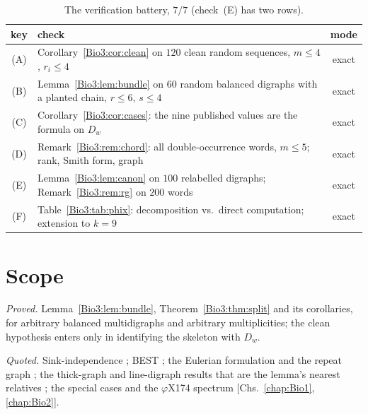 \begin{table}[ht]
\centering\small
\begin{tabular}{clc}
\toprule
key & check & mode\\
\midrule
(A) & Corollary~\ref{Bio3:cor:clean} on $120$ clean random sequences, $m\le4$, $r_i\le4$ & exact\\
(B) & Lemma~\ref{Bio3:lem:bundle} on $60$ random balanced digraphs with a planted chain, $r\le6$, $s\le4$ & exact\\
(C) & Corollary~\ref{Bio3:cor:cases}: the nine published values are the formula on $D_w$ & exact\\
(D) & Remark~\ref{Bio3:rem:chord}: all double-occurrence words, $m\le5$; rank, Smith form, graph & exact\\
(E) & Lemma~\ref{Bio3:lem:canon} on $100$ relabelled digraphs; Remark~\ref{Bio3:rem:rg} on $200$ words & exact\\
(F) & Table~\ref{Bio3:tab:phix}: decomposition vs.\ direct computation; extension to $k=9$ & exact\\
\bottomrule
\end{tabular}
\caption{The verification battery, $7/7$ (check~(E) has two rows).}
\label{Bio3:tab:battery}
\end{table}

\section{Scope}\label{Bio3:sec:scope}

\emph{Proved.} Lemma~\ref{Bio3:lem:bundle}, Theorem~\ref{Bio3:thm:split} and its corollaries, for
arbitrary balanced multidigraphs and arbitrary multiplicities; the clean hypothesis
enters only in identifying the skeleton with $D_w$.

\emph{Quoted.} Sink-independence \cite{HLMPPW}; BEST \cite{AEdB,SmithTutte}; the
Eulerian formulation and the repeat graph \cite{PTW,PTT,Flye}; the thick-graph and
line-digraph results that are the lemma's nearest relatives
\cite{ChenSchedler,Alar,Levine,PSX}; the special cases and the $\varphi$X174 spectrum
[Chs.~\ref{chap:Bio1}, \ref{chap:Bio2}].

